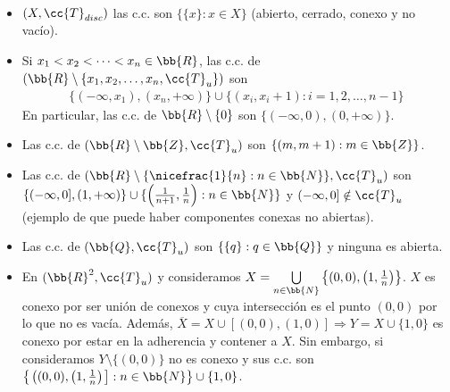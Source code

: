 \begin{ejemplo}\
    \begin{itemize}
        \item $(X, \cc{T}_{disc})$ las c.c. son $\{\{x\}:x\in X\}$ (abierto, cerrado, conexo y no vacío).
        \item Si $x_1<x_2<\dots<x_n \in \bb{R}$, las c.c. de $(\bb{R}\setminus \{x_1,x_2,\dots,x_n, \cc{T}_u\})$ son 
        \begin{align*}
        \{(-\infty, x_1), (x_n, +\infty)\}\cup\{(x_i, x_i+1):i=1,2,\dots,n-1\}
        \end{align*}
        En particular, las c.c. de $\bb{R}\setminus \{0\}$ son $\{(-\infty,0),(0,+\infty)\}$. 
        \item Las c.c. de $(\bb{R}\setminus \bb{Z}, \cc{T}_u)$ son $\{(m,m+1):m\in \bb{Z}\}$.
        \item Las c.c. de $(\bb{R}\setminus \{\nicefrac{1}{n}:n\in \bb{N}\}, \cc{T}_u)$ son $\{(-\infty, 0], (1, +\infty)\}\cup \{\left(\frac{1}{n+1}, \frac{1}{n}\right):n\in \bb{N}\}$ y $(-\infty,0] \notin \cc{T}_u$ (ejemplo de que puede haber componentes conexas no abiertas).
        \item Las c.c. de $(\bb{Q}, \cc{T}_u)$ son $\{\{q\}:q\in \bb{Q}\}$ y ninguna es abierta.
        \item En $(\bb{R}^2, \cc{T}_u)$ y consideramos $X=\bigcup\limits_{n\in \bb{N}}\left\{(0,0), \left(1, \frac{1}{n}\right)\right\}$. $X$ es conexo por ser unión de conexos y cuya intersección es el punto $(0,0)$ por lo que no es vacía. Además, $\overline{X}=X\cup [(0,0),(1,0)]\Rightarrow Y = X \cup \{1,0\}$ es conexo por estar en la adherencia y contener a $X$. Sin embargo, si consideramos $Y\setminus \{(0,0)\}$ no es conexo y sus c.c. son $\left\{ \left.\left((0,0), \left(1, \frac{1}{n}\right)\right.\right] : n\in \bb{N} \right\}\cup \{1,0\}$.
    \end{itemize}
    \endsquare
\end{ejemplo}

